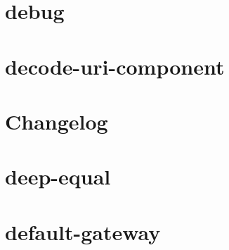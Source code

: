 \documentclass[twoside]{book}
\newcommand{\+}{\discretionary{\mbox{\scriptsize$\hookleftarrow$}}{}{}}
\begin{document}
\chapter{debug}
\label{md__c___users_vaishnavi_jadhav__desktop__developer_code_mean_stack_example_client_node_modules_debug__r_e_a_d_m_e}

\chapter{decode-\/uri-\/component}
\label{md__c___users_vaishnavi_jadhav__desktop__developer_code_mean_stack_example_client_node_modules_decode_uri_component_readme}

\chapter{Changelog}
\label{md__c___users_vaishnavi_jadhav__desktop__developer_code_mean_stack_example_client_node_modules_deep_equal__c_h_a_n_g_e_l_o_g}

\chapter{deep-\/equal}
\label{md__c___users_vaishnavi_jadhav__desktop__developer_code_mean_stack_example_client_node_modules_deep_equal_readme}

\chapter{default-\/gateway}
\label{md__c___users_vaishnavi_jadhav__desktop__developer_code_mean_stack_example_client_node_modules_default_gateway__r_e_a_d_m_e}

\end{document}
